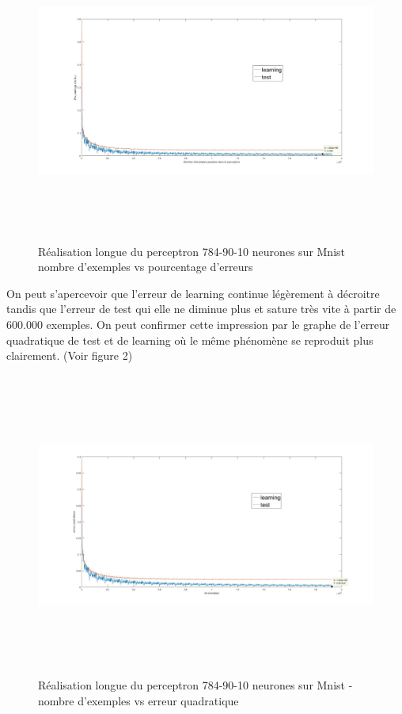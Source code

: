 \documentclass[a4paper,oneside]{report}
\begin{document}
\begin{figure}[!h]
	\begin{center}
		\includegraphics[width=17cm,height=10cm]{Images/courbes_error_longue.jpg} 
		\caption{Réalisation longue du perceptron 784-90-10 neurones sur Mnist nombre d'exemples vs pourcentage d'erreurs}
	\end{center}
\end{figure}


On peut s'apercevoir que l'erreur de learning continue légèrement à décroitre tandis que l'erreur de test qui elle ne diminue plus et sature très vite à partir de 600.000 exemples. On peut confirmer cette impression par le graphe de l'erreur quadratique de test et de learning où le même phénomène se reproduit plus clairement.
(Voir figure 2)  


\begin{figure}[!h]
	\begin{center}
	\includegraphics[width=17cm,height=10cm]{Images/courbes_quaderror_longue.jpg} 
	\caption{Réalisation longue du perceptron 784-90-10 neurones sur Mnist - nombre d'exemples vs erreur quadratique} 
	\end{center}
\end{figure}
\end{document}
